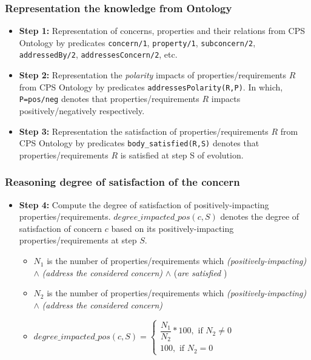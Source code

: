 \documentclass{beamer}
\begin{document}
\begin{frame}[fragile]
	\frametitle{Representation the knowledge from Ontology}
	\begin{itemize}
		\item {\bf Step 1:} Representation of concerns, properties and their relations from CPS Ontology by predicates {\tt concern/1}, {\tt property/1}, {\tt subconcern/2}, {\tt addressedBy/2}, {\tt addressesConcern/2}, etc.  
		\item {\bf Step 2:} Representation the \emph{polarity} impacts of properties/requirements $R$ from CPS Ontology by predicates {\tt addressesPolarity(R,P)}. In which, {\tt P=pos/neg} denotes that properties/requirements $R$ impacts positively/negatively respectively. 
		\item {\bf Step 3:} Representation the satisfaction of properties/requirements $R$ from CPS Ontology by predicates {\tt body\_satisfied(R,S)} denotes that properties/requirements $R$ is satisfied at step S of evolution.
	\end{itemize}
\end{frame}
\begin{frame}[fragile]
	\frametitle{Reasoning degree of satisfaction of the concern}
	\begin{itemize}
		\item {\bf Step 4:} Compute the degree of satisfaction of positively-impacting properties/requirements. $degree\_impacted\_pos(c,S)$ denotes the degree of satisfaction of concern $c$ based on its positively-impacting properties/requirements at step $S$.
		\begin{itemize}
		\item $N_1$ is the number of properties/requirements which \emph{(positively-impacting)} $\land$ \emph{(address the considered concern)} 
		$\land$ (\emph{are satisfied} )
		\item $N_2$ is the number of properties/requirements which \emph{(positively-impacting)} 
		$\land$ \emph{(address the considered concern)} 
		\item
		$
		degree\_impacted\_pos(c,S) = 
		\begin{cases}
		\dfrac{N_1}{N_2}*100, \text{ if } N_2 \neq 0 \\
		100, \text{ if } N_2 = 0 
		\end{cases} 
		$
		\end{itemize}
	\end{itemize}
\end{frame}
\end{document}
